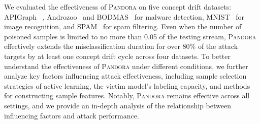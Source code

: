 \documentclass[lettersize,journal]{IEEEtran}
\newcommand{\pandora}{{\scshape Pandora}\xspace}
\begin{document}
We evaluated the effectiveness of \pandora on five concept drift datasets: APIGraph~\cite{2020-CCS-APIGraph} , Androzoo~\cite{2016-Androzoo} and BODMAS~\cite{2021-PE-malware-dataset} for malware detection, MNIST~\cite{2017-MINIST-dataset} for image recognition, and SPAM~\cite{2010-Spam-Emali-dataset} for spam filtering.
Even when the number of poisoned samples is limited to no more than 0.05 of the testing stream, \pandora effectively extends the misclassification duration for over 80\% of the attack targets by at least one concept drift cycle across four datasets.
To better understand the effectiveness of \pandora under different conditions, we further analyze key factors influencing attack effectiveness, including sample selection strategies of active learning, the victim model's labeling capacity, and methods for constructing sample features.
Notably, \pandora remains effective across all settings, and we provide an in-depth analysis of the relationship between influencing factors and attack performance.
\end{document}
